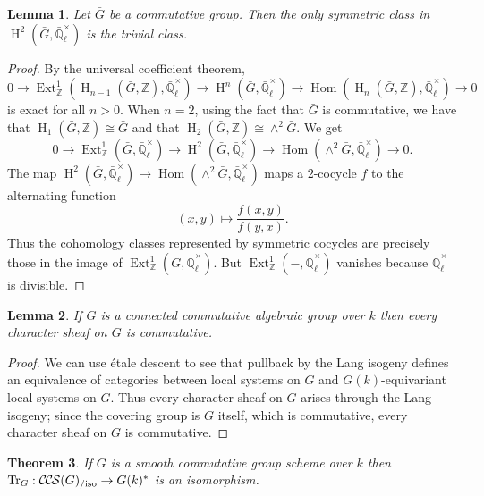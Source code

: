 \documentclass[10pt]{amsart}
\theoremstyle{plain}
\newtheorem{theorem}{Theorem}[section]
\newtheorem{lemma}[theorem]{Lemma}
\theoremstyle{definition}
\newcommand{\ZZ}{{\mathbb{Z}}}
\newcommand{\EE}{\mathbb{\bar Q}_\ell}
\newcommand{\Fq}{k}
\newcommand{\EEx}{\EE^\times}
\DeclareMathOperator{\Hom}{Hom}
\DeclareMathOperator{\Ext}{Ext}
\DeclareMathOperator{\Hh}{H}
\newcommand{\TrFrob}[1]{\operatorname{Tr}_{#1}}
\newcommand{\CCS}{{\mathcal{C\hskip-.8pt C\hskip-0.8pt S}}}
\newcommand{\CCSiso}[1]{\CCS(#1)_{/\text{iso}}}
\newcommand{\bG}{\bar{G}}
\begin{document}
\begin{lemma} \label{lem:symtriv}
Let $\bG$ be a commutative group.  Then the only symmetric class in $\Hh^2(\bG, \EEx)$ is the trivial class.
\end{lemma}

\begin{proof}
By the universal coefficient theorem,
\[
0 \to \Ext^1_\ZZ(\Hh_{n-1}(\bG, \ZZ), \EEx) \to \Hh^n(\bG, \EEx) \to \Hom(\Hh_n(\bG, \ZZ), \EEx) \to 0
\]
is exact for all $n > 0$.  When $n = 2$, using the fact that $\bG$ is commutative, we have that $\Hh_1(\bG, \ZZ) \cong \bG$
and that $\Hh_2(\bG, \ZZ) \cong \wedge^2 \bG$. We get
\[
0 \to \Ext^1_\ZZ(\bG, \EEx) \to \Hh^2(\bG, \EEx) \to \Hom(\wedge^2 \bG, \EEx) \to 0.
\]
The map $\Hh^2(\bG, \EEx) \to \Hom(\wedge^2 \bG, \EEx)$ maps a $2$-cocycle $f$ to the alternating function
\[
(x,y) \mapsto \frac{f(x,y)}{f(y,x)}.
\]
Thus the cohomology classes represented by symmetric cocycles are precisely those in the image of $\Ext^1_\ZZ(\bG, \EEx)$.
But $\Ext^1_\ZZ(-, \EEx)$ vanishes because $\EEx$ is divisible.
\end{proof}



\begin{lemma} \label{lem:conncomm}
If $G$ is a connected commutative algebraic group over $\Fq$ then every character sheaf on $G$ is commutative.
\end{lemma}

\begin{proof}
We can use \'etale descent to see that pullback by the Lang isogeny defines an equivalence
of categories between local systems on $G$ and $G(\Fq)$-equivariant local systems on $G$.  Thus every character
sheaf on $G$ arises through the Lang isogeny; since the covering group is $G$ itself, which is commutative,
every character sheaf on $G$ is commutative.
\end{proof}

\begin{theorem} \label{thm:trfrobiso}
If $G$ is a smooth commutative group scheme over $\Fq$ then $\TrFrob{G} : \CCSiso{G} \to G(\Fq)^*$ is an isomorphism.
\end{theorem}
\end{document}
